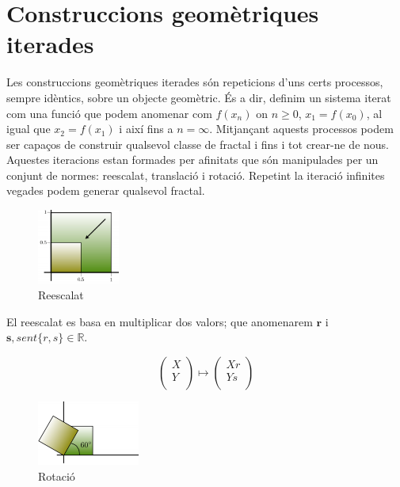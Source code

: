 \documentclass[12pt]{report}
\begin{document}
\section{Construccions geomètriques iterades}
\justifying
Les construccions geomètriques iterades són repeticions d'uns certs processos, sempre idèntics, sobre un objecte geomètric.
És a dir, definim un sistema iterat com una funció que podem anomenar com $f(x_n)$ on $n \geq 0$, $x_1=f(x_0)$, al igual que $x_2=f(x_1)$ i així fins a $n=\infty$.
\newline
Mitjançant aquests processos podem ser capaços de construir qualsevol classe de fractal i fins i tot crear-ne de nous.
\newline
Aquestes iteracions estan formades per afinitats que són manipulades per un conjunt de normes: reescalat, translació i rotació. Repetint la iteració infinites vegades podem generar qualsevol fractal.
\newline
\begin{figure}
    \includegraphics[width=0.24\textwidth]{Captura.PNG}
    \caption{Reescalat}
    \end{figure}
    \newline
    \newline
 El reescalat es basa en multiplicar dos valors; que anomenarem $\textbf{r}$ i $ \textbf{s}, sent\{r, s\} \in \mathbb{R}.$
    
\hspace{12em} $$
\begin{pmatrix}
X \\
Y \\
\end{pmatrix}
\mapsto
\begin{pmatrix}
Xr\\
Ys\\
\end{pmatrix} 
$$
\newline
\newline



\begin{figure}
    \includegraphics [width=0.3\textwidth] {rota.PNG}
    \caption{Rotació}
\end{figure}
\end{document}
